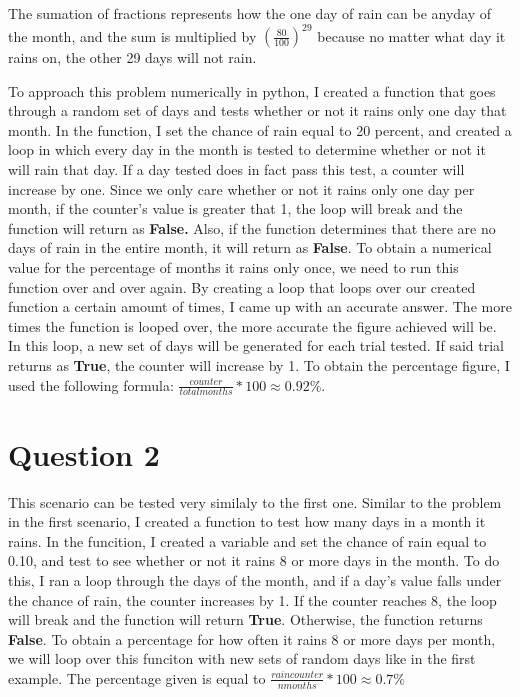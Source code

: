 \documentclass[twocolumn]{revtex4}
\begin{document}
The sumation of fractions represents how the one day of rain can be anyday of the month, and the sum is multiplied by $(\frac{80}{100}) ^{29} $ because no matter what day it rains on, the other 29 days will not rain.


To approach this problem numerically in python, I created a function that goes through a random set of days and tests whether or not it rains only one day that month.  In the function, I set the chance of rain equal to 20 percent, and created a loop in which every day in the month is tested to determine whether or not it will rain that day. If a day tested does in fact pass this test, a counter will increase by one.  Since we only care whether or not it rains only one day per month, if the counter's value is greater that 1, the loop will break and the function will return as \textbf{False.}  Also, if the function determines that there are no days of rain in the entire month, it will return as \textbf{False}.  To obtain a numerical value for the percentage of months it rains only once, we need to run this function over and over again.  By creating a loop that loops over our created function a certain amount of times, I came up with an accurate answer.  The more times the function is looped over, the more accurate the figure achieved will be.  In this loop, a new set of days will be generated for each trial tested.  If said trial returns as \textbf{True}, the counter will increase by 1.  To obtain the percentage figure, I used the following formula: $ \frac{counter}{total months} * 100 \approx 0.92 \% $. 

\section{Question 2}

This scenario can be tested very similaly to the first one.   Similar to the problem in the first scenario, I created a function to test how many days in a month it rains.  In the funcition, I created a variable and set the chance of rain equal to 0.10, and test to see whether or not it rains 8 or more days in the month.  To do this, I ran a loop through the days of the month, and if a day's value falls under the chance of rain, the counter increases by 1.  If the counter reaches 8, the loop will break and the function will return \textbf{True}.  Otherwise, the function returns \textbf{False}.  To obtain a percentage for how often it rains 8 or more days per month, we will loop over this funciton with new sets of random days like in the first example.  The percentage given is equal to $ \frac{raincounter}{nmonths} * 100 \approx  0.7 \% $
\end{document}

